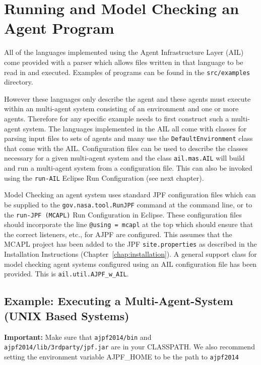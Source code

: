 \chapter{Running and Model Checking an Agent Program}
\label{chap:running}

All of the languages implemented using the Agent Infrastructure Layer (AIL) come provided with a parser which allows files written in that language to be read in and executed.  Examples of programs can be found in the \texttt{src/examples} directory.

However these languages only describe the agent and these agents must execute within an multi-agent system consisting of an environment and one or more agents.  Therefore for any specific example needs to first construct such a multi-agent system.  The languages implemented in the AIL all come with classes for parsing input files to sets of agents and many use the \texttt{DefaultEnvironment} class that come with the AIL. Configuration files can be used to describe the classes necessary  for a given multi-agent system and the class \texttt{ail.mas.AIL} will build and run a multi-agent system from a configuration file.  This can also be invoked using the \texttt{run-AIL} Eclipse Run Configuration (see next chapter).

Model Checking an agent system uses standard JPF configuration files which can be supplied to the \texttt{gov.nasa.tool.RunJPF} command at the command line, or to the \texttt{run-JPF (MCAPL)} Run Configuration in Eclipse.  These configuration files should incorporate the line \texttt{@using = mcapl} at the top which should ensure that the correct listeners, etc., for AJPF are configured.  This assumes that the MCAPL project has been added to the JPF \texttt{site.properties} as described in the Installation Instructions (Chapter~\ref{chap:installation}).  A general support class for model checking agent systems configured using an AIL configuration file has been provided.  This is \texttt{ail.util.AJPF\_w\_AIL}. 

\section{Example: Executing a Multi-Agent-System (UNIX Based Systems)}
{\bf Important:} Make sure that \texttt{ajpf2014/bin} and \texttt{ajpf2014/lib/3rdparty/jpf.jar} are in your CLASSPATH.  We also recommend setting the environment variable AJPF\_HOME to be the path to \texttt{ajpf2014}

